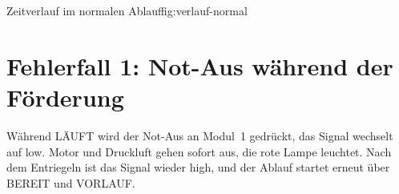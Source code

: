 \begin{zeitdiagramm}{Zeitverlauf im normalen Ablauf}{fig:verlauf-normal}
\end{zeitdiagramm}

\clearpage
\section{Fehlerfall 1: Not-Aus während der Förderung}
\label{sec:verlauf-notaus}

Während LÄUFT wird der Not-Aus an Modul~1 gedrückt, das Signal wechselt auf
low. Motor und Druckluft gehen sofort aus, die rote Lampe leuchtet. Nach dem
Entriegeln ist das Signal wieder high, und der Ablauf startet erneut über
BEREIT und VORLAUF.

